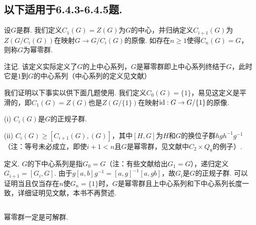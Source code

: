 
\subsection*{以下适用于6.4.3-6.4.5题.}

设$G$是群. 我们定义$C_1(G)=Z(G)$为$G$的中心，并归纳定义$C_{i+1}(G)$为$Z(G/C_i(G))$在映射$G\rightarrow G/C_i(G)$的原像. 如存在$n\geq 1$使得$C_n(G)=G$，则称$G$为{\heiti 幂零群.}

{\heiti 注记.} 该定义实际定义了$G$的{\heiti 上中心系列}，$G$是幂零群即上中心系列终结于$G$，此时它是$1$到$G$的{\heiti 中心系列}（中心系列的定义见文献\cite{wiki:cen}）

\jie 我们证明以下事实以供下面几题使用. 我们定义$C_0(G)=\{1\}$，易见这定义是平滑的，即$C_1(G)=Z(G)$也是$Z(G/\{1\})$在映射$\operatorname{id}: G\rightarrow G/\{1\}$的原像.

(i) $C_i(G)$是$G$的正规子群.


(ii) $C_i(G)\geq[C_{i+1}(G),(G)]$，其中$[H,G]$为$H$和$G$的换位子群$hgh^{-1}g^{-1}$（注：等号未必成立，即使$i+1<n$且$G$是幂零群，见文献\cite{wiki:cen}中$C_2\times Q_8$的例子）.


{\heiti 定义.} $G$的{\heiti 下中心系列}是指$G_0=G$（注：有些文献给出$G_1=G$），递归定义$G_{i+1}=[G_i,G]$. 由于$g[a,b]g^{-1}=[a,g]^{-1}[a,gb]$，故$G_i$是$G$的正规子群. 可以证明当且仅当存在$n$使$G_n=\{1\}$时，$G$是幂零群且上中心系列和下中心系列长度一致，详细证明见文献\cite{groupprops_nilpotency}，本书不再赘述.

\subsection{}
幂零群一定是可解群.


